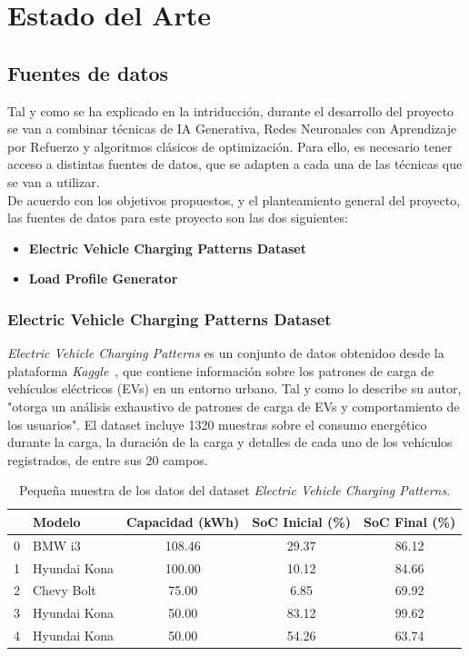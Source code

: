 \chapter{Estado del Arte}
\label{chapter:chapter2}
\section{Fuentes de datos}
Tal y como se ha explicado en la intriducción, durante el desarrollo del proyecto se van a combinar
técnicas de IA Generativa, Redes Neuronales con Aprendizaje por Refuerzo y algoritmos clásicos de 
optimización. Para ello, es necesario tener acceso a distintas fuentes de datos, que se adapten
a cada una de las técnicas que se van a utilizar.\\

De acuerdo con los objetivos propuestos, y el planteamiento general del proyecto, las fuentes de 
datos para este proyecto son las dos siguientes:
\begin{itemize}
    \item \textbf{Electric Vehicle Charging Patterns Dataset}
    \item \textbf{Load Profile Generator}
\end{itemize}

\subsection{Electric Vehicle Charging Patterns Dataset}
\textit{Electric Vehicle Charging Patterns} es un conjunto de datos obtenidoo desde la plataforma
\textit{Kaggle}~\cite{kaggle_ev_charging_patterns}, que contiene información sobre los patrones de 
carga de vehículos eléctricos (EVs) en un entorno urbano. Tal y como lo describe su autor, "otorga 
un análisis exhaustivo de patrones de carga de EVs y comportamiento de los usuarios". El dataset 
incluye 1320 muestras sobre el consumo energético durante la carga, la duración de la carga y 
detalles de cada uno de los vehículos registrados, de entre sus 20 campos.\\
\vfill
\begin{table}[ht]
\begingroup
\centering
\setlength{\tabcolsep}{6pt}
\begin{tabular}{c|l c c c}
 & Modelo & Capacidad (kWh) & SoC Inicial (\%) & SoC Final (\%) \\
\hline
0 & BMW i3 & 108.46 & 29.37 & 86.12 \\
1 & Hyundai Kona & 100.00 & 10.12 & 84.66 \\
2 & Chevy Bolt & 75.00 & 6.85 & 69.92 \\
3 & Hyundai Kona & 50.00 & 83.12 & 99.62 \\
4 & Hyundai Kona & 50.00 & 54.26 & 63.74 \\
\end{tabular}
\caption{Pequeña muestra de los datos del dataset \textit{Electric Vehicle Charging Patterns}.}
\label{tab:ev_charging_patterns_example}
\endgroup
\end{table}

